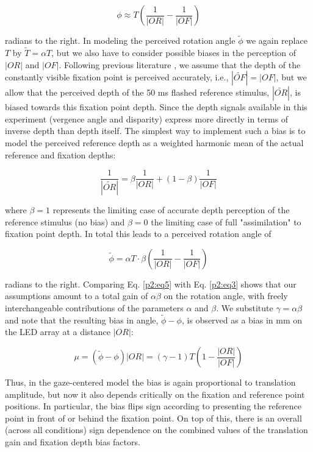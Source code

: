 \begin{equation}
\label{p2:eq3}
\phi \approx T (\frac{1}{|OR|} - \frac{1}{|OF|})
\end{equation}

radians to the right. In modeling the perceived rotation angle $\tilde{\phi}$ we again replace $T$ by $\tilde{T} = {\alpha}T$, but we also have to consider possible biases in the perception of $|OR|$ and $|OF|$. Following previous literature \cite{gogel1977, medendorp2003b}, we assume that the depth of the constantly visible fixation point is perceived accurately, i.e., $|\tilde{OF}| = |OF|$, but we allow that the perceived depth of the 50 ms flashed reference stimulus, $|\tilde{OR}|$, is biased towards this fixation point depth. Since the depth signals available in this experiment (vergence angle and disparity) express more directly in terms of inverse depth than depth itself. The simplest way to implement such a bias is to model the perceived reference depth as a weighted harmonic mean of the actual reference and fixation depths:

\begin{equation}
\label{p2:eq4}
\frac{1}{|\tilde{OR}|} = \beta \frac{1}{|OR|} + (1 - \beta) \frac{1}{|OF|}
\end{equation}

where $\beta = 1$ represents the limiting case of accurate depth perception of the reference stimulus (no bias) and $\beta = 0$ the limiting case of full "assimilation" to fixation point depth. In total this leads to a perceived rotation angle of

\begin{equation}
\label{p2:eq5}
\tilde{\phi} = {\alpha}T \cdot \beta(\frac{1}{|OR|} - \frac{1}{|OF|})
\end{equation}

radians to the right. Comparing Eq. \ref{p2:eq5} with Eq. \ref{p2:eq3} shows that our assumptions amount to a total gain of $\alpha\beta$ on the rotation angle, with freely interchangeable contributions of the parameters $\alpha$ and $\beta$. We substitute $\gamma = \alpha\beta$ and note that the resulting bias in angle, $\tilde{\phi} - \phi$, is observed as a bias in mm on the LED array at a distance $|OR|$:

\begin{equation}
\label{p2:eq6}
\mu = (\tilde{\phi} - \phi)|OR| = (\gamma - 1)T(1 - \frac{|OR|}{|OF|})
\end{equation}

Thus, in the gaze-centered model the bias is again proportional to translation amplitude, but now it also depends critically on the fixation and reference point positions. In particular, the bias flips sign according to presenting the reference point in front of or behind the fixation point. On top of this, there is an overall (across all conditions) sign dependence on the combined values of the translation gain and fixation depth bias factors.

